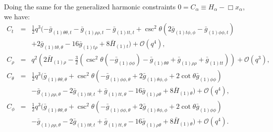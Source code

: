 \documentclass[a4paper,11pt]{article}
\numberwithin{equation}{section}
\begin{document}
Doing the same for the generalized harmonic constraints $0=C_\alpha\equiv H_\alpha-\Box x_\alpha$, we have:
\begin{eqnarray}
\label{eqn:ct_3p1}
C_t&=&\frac{1}{2} q^3 (-\bar{g}_{(1)\theta \theta,t}-\bar{g}_{(1) \rho \rho ,t}-\bar{g}_{(1)
   \text{$tt$},t}+\csc ^2\theta \left(2 \bar{g}_{(1) \text{$t$$\phi $},\phi }-\bar{g}_{(1)
   \phi \phi ,t}\right)\nonumber\\
   &&+2 \bar{g}_{(1) \text{$t$$\theta $},\theta }-16 \bar{g}_{(1)
   \text{$t$$\rho $}}+8 \bar{H}_{(1) t})+\mathcal{O}(q^4),\\
%
\label{eqn:crho_3p1}
C_\rho&=&q^2 \left(2 \bar{H}_{(1) \rho }-\frac{3}{2} \left(\csc^2\theta \left(-\bar{g}_{(1) \phi
   \phi }\right)-\bar{g}_{(1)\theta \theta}+\bar{g}_{(1) \rho \rho }+\bar{g}_{(1)
   \text{$tt$}}\right)\right)+\mathcal{O}(q^3),\\
%
\label{eqn:ctheta_3p1}
C_\theta&=&\frac{1}{2} q^3 (\bar{g}_{(1)\theta \theta,\theta }+\csc ^2\theta
   \left(-\bar{g}_{(1) \phi \phi ,\theta }+2 \bar{g}_{(1)\theta \phi,\phi }+2 \cot \theta
    \bar{g}_{(1) \phi \phi }\right)\nonumber\\
   &&-\bar{g}_{(1) \rho \rho ,\theta }-2 \bar{g}_{(1)
   \text{$t$$\theta $},t}+\bar{g}_{(1) \text{$tt$},\theta }-16 \bar{g}_{(1) \rho \theta }+8
   \bar{H}_{(1)\theta})+\mathcal{O}(q^4),\\
%
\label{eqn:cphi_3p1}
C_\phi&=&\frac{1}{2} q^3 (\bar{g}_{(1)\theta \theta,\theta }+\csc ^2\theta
   \left(-\bar{g}_{(1) \phi \phi ,\theta }+2 \bar{g}_{(1)\theta \phi,\phi }+2 \cot \theta
    \bar{g}_{(1) \phi \phi }\right)\nonumber\\
   &&-\bar{g}_{(1) \rho \rho ,\theta }-2 \bar{g}_{(1)
   \text{$t$$\theta $},t}+\bar{g}_{(1) \text{$tt$},\theta }-16 \bar{g}_{(1) \rho \theta }+8
   \bar{H}_{(1)\theta})+\mathcal{O}(q^4).
\end{eqnarray}
\end{document}
